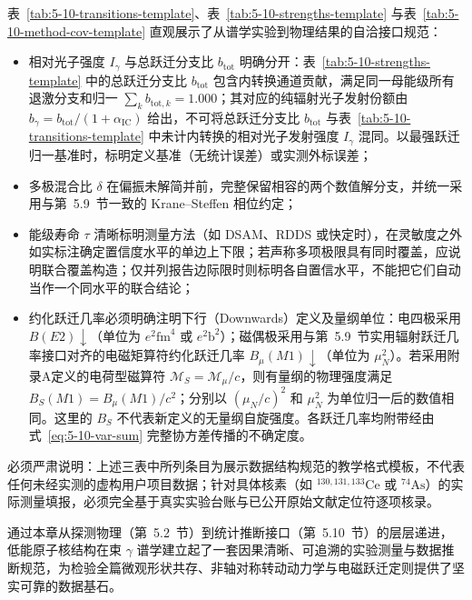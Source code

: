 表~\ref{tab:5-10-transitions-template}、表~\ref{tab:5-10-strengths-template} 与表~\ref{tab:5-10-method-cov-template} 直观展示了从谱学实验到物理结果的自洽接口规范：
\begin{itemize}
\item 相对光子强度 $I_\gamma$ 与总跃迁分支比 $b_{\mathrm{tot}}$ 明确分开：表~\ref{tab:5-10-strengths-template} 中的总跃迁分支比 $b_{\mathrm{tot}}$ 包含内转换通道贡献，满足同一母能级所有退激分支和归一 $\sum_k b_{\mathrm{tot}, k} = 1.000$；其对应的纯辐射光子发射份额由 $b_\gamma = b_{\mathrm{tot}} / (1 + \alpha_{\mathrm{IC}})$ 给出，不可将总跃迁分支比 $b_{\mathrm{tot}}$ 与表~\ref{tab:5-10-transitions-template} 中未计内转换的相对光子发射强度 $I_\gamma$ 混同。以最强跃迁归一基准时，标明定义基准（无统计误差）或实测外标误差；
\item 多极混合比 $\delta$ 在偏振未解简并前，完整保留相容的两个数值解分支，并统一采用与第~5.9~节一致的 Krane--Steffen 相位约定；
\item 能级寿命 $\tau$ 清晰标明测量方法（如 DSAM、RDDS 或快定时），在灵敏度之外如实标注确定置信度水平的单边上下限；若声称多项极限具有同时覆盖，应说明联合覆盖构造；仅并列报告边际限时则标明各自置信水平，不能把它们自动当作一个同水平的联合结论；
\item 约化跃迁几率必须明确注明下行（Downwards）定义及量纲单位：电四极采用 $B(E2)\downarrow$（单位为 $e^2\text{fm}^4$ 或 $e^2\text{b}^2$）；磁偶极采用与第~5.9~节实用辐射跃迁几率接口对齐的电磁矩算符约化跃迁几率 $B_\mu(M1)\downarrow$（单位为 $\mu_N^2$）。若采用附录A定义的电荷型磁算符 $\mathcal M_S=\mathcal M_\mu/c$，则有量纲的物理强度满足 $B_S(M1)=B_\mu(M1)/c^2$；分别以 $(\mu_N/c)^2$ 和 $\mu_N^2$ 为单位归一后的数值相同。这里的 $B_S$ 不代表新定义的无量纲自旋强度。各跃迁几率均附带经由式~\eqref{eq:5-10-var-sum} 完整协方差传播的不确定度。
\end{itemize}
必须严肃说明：上述三表中所列条目为展示数据结构规范的教学格式模板，不代表任何未经实测的虚构用户项目数据；针对具体核素（如 $^{130, 131, 133}\mathrm{Ce}$ 或 $^{74}\mathrm{As}$）的实际测量填报，必须完全基于真实实验台账与已公开原始文献定位符逐项核录。

通过本章从探测物理（第~5.2~节）到统计推断接口（第~5.10~节）的层层递进，低能原子核结构在束 $\gamma$ 谱学建立起了一套因果清晰、可追溯的实验测量与数据推断规范，为检验全篇微观形状共存、非轴对称转动动力学与电磁跃迁定则提供了坚实可靠的数据基石。
